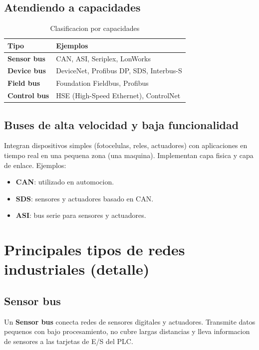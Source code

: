 \subsection{Atendiendo a capacidades}

\begin{table}[htbp]
\centering
\small
\caption{Clasificacion por capacidades}
\begin{tabularx}{\textwidth}{@{}lX@{}}
\toprule
\textbf{Tipo} & \textbf{Ejemplos} \\
\midrule
\textbf{Sensor bus} & CAN, ASI, Seriplex, LonWorks \\
\textbf{Device bus} & DeviceNet, Profibus DP, SDS, Interbus-S \\
\textbf{Field bus} & Foundation Fieldbus, Profibus \\
\textbf{Control bus} & HSE (High-Speed Ethernet), ControlNet \\
\bottomrule
\end{tabularx}
\end{table}

\subsection{Buses de alta velocidad y baja funcionalidad}

Integran dispositivos simples (fotocelulas, reles, actuadores) con aplicaciones en tiempo real en una pequena zona (una maquina). Implementan capa fisica y capa de enlace. Ejemplos:

\begin{itemize}
    \item \textbf{CAN}: utilizado en automocion.
    \item \textbf{SDS}: sensores y actuadores basado en CAN.
    \item \textbf{ASI}: bus serie para sensores y actuadores.
\end{itemize}


\section{Principales tipos de redes industriales (detalle)}

\subsection{Sensor bus}

\begin{definicion}
Un \textbf{Sensor bus} conecta redes de sensores digitales y actuadores. Transmite datos pequenos con bajo procesamiento, no cubre largas distancias y lleva informacion de sensores a las tarjetas de E/S del PLC.
\end{definicion}

